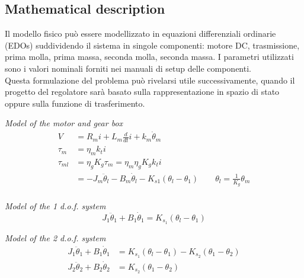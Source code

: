 \subsection{Mathematical description}

Il modello fisico può essere modellizzato in equazioni differenziali ordinarie (EDOs) suddividendo il sistema in singole componenti: motore DC, trasmissione, prima molla, prima massa, seconda molla, seconda massa. I parametri utilizzati sono i valori nominali forniti nei manuali di setup delle componenti. \\
Questa formulazione del problema può rivelarsi utile successivamente, quando il progetto del regolatore sarà basato sulla rappresentazione in spazio di stato oppure sulla funzione di trasferimento.



\textit{Model of the motor and gear box}
\begin{subequations}
	\begin{align}
		V &= R_m i + L_m \frac{d}{dt}i + k_m \dot{\theta}_m \\
		\tau_m &= \eta_m k_t i \\
		\tau_{ml} &= \eta_g K_g \tau_m = \eta_m \eta_g K_g k_t i\\
		&= -J_m \ddot{\theta}_l - B_m \dot{\theta}_l - K_{s1} ( \theta_l - \theta_1 ) \qquad  \theta_l = \frac {1}{K_g} \theta_m \\
		\label{model_equations}
	\end{align}
\end{subequations}

\textit{Model of the 1 d.o.f. system}
\begin{equation}
	J_1 \ddot{\theta}_1 + B_1 \dot{\theta}_1 = K_{s_1} ( \theta_l - \theta_1 )
\end{equation}

\textit{Model of the 2 d.o.f. system}
\begin{subequations}
	\begin{align}
		J_1 \ddot{\theta}_1 + B_1 \dot{\theta}_1 &= K_{s_1} ( \theta_l - \theta_1 ) - K_{s_2} ( \theta_1 - \theta_2 ) \\
		J_2 \ddot{\theta}_2 + B_2 \dot{\theta}_2 &= K_{s_2} ( \theta_1 - \theta_2 )
	\end{align}
\end{subequations}

